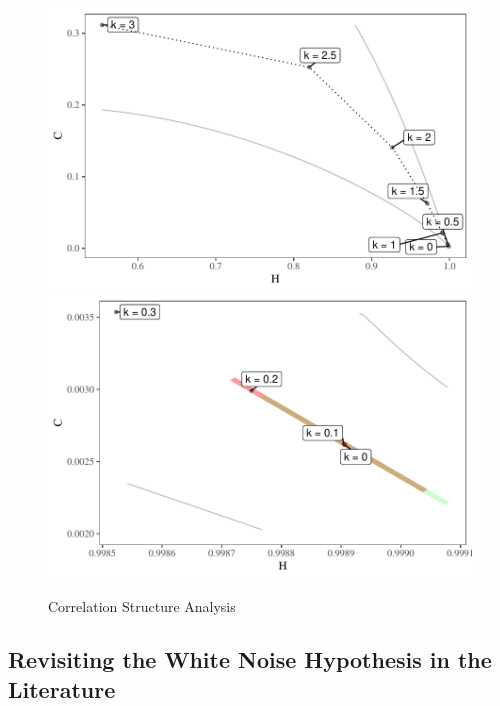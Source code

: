 \begin{figure}[H]
    \centering
	\includegraphics[width=.48\linewidth]{Figures/Correlation-Analysis-dotted.pdf}
    \includegraphics[width=.48\linewidth]{Figures/Correlation-Analysis-point.pdf}
    \caption{Correlation Structure Analysis
    }
    \label{fig:correlation}
\end{figure}

\subsection{Revisiting the White Noise Hypothesis in the Literature}


